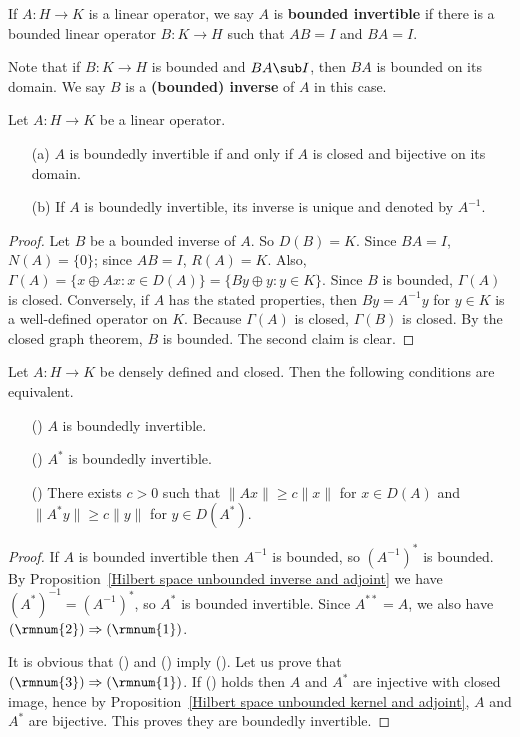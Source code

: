 \begin{definition}
If $A:H\to K$ is a linear operator, we say $A$ is \textbf{bounded invertible} if there is a bounded linear operator $B:K\to H$ such that $AB=I$ and $BA=I$.
\end{definition}
Note that if $B:K\to H$ is bounded and $BA\sub I$, then $BA$ is bounded on its domain. We say $B$ is a \textbf{(bounded) inverse} of $A$ in this case.
\begin{proposition}\label{Hilbert space unbounded bounded invertible iff}
Let $A:H\to K$ be a linear operator.
\begin{itemize}
\item[(a)] $A$ is boundedly invertible if and only if $A$ is closed and bijective on its domain.
\item[(b)] If $A$ is boundedly invertible, its inverse is unique and denoted by $A^{-1}$.
\end{itemize}
\end{proposition}
\begin{proof}
Let $B$ be a bounded inverse of $A$. So $D(B)=K$. Since $BA=I$, $N(A)=\{0\}$; since $AB=I$, $R(A)=K$. Also, $\Gamma(A)=\{x\oplus Ax:x\in D(A)\}=\{By\oplus y:y\in K\}$. Since $B$ is bounded, $\Gamma(A)$ is closed. Conversely, if $A$ has the stated properties, then $By=A^{-1}y$ for $y\in K$ is a well-defined operator on $K$. Because $\Gamma(A)$ is closed, $\Gamma(B)$ is closed. By the closed graph theorem, $B$ is bounded. The second claim is clear.
\end{proof}
\begin{proposition}\label{Hilbert space unbounded invertible iff adjoint is}
Let $A:H\to K$ be densely defined and closed. Then the following conditions are equivalent.
\begin{itemize}
\item[(\rmnum{1})] $A$ is boundedly invertible.
\item[(\rmnum{2})] $A^*$ is boundedly invertible.
\item[(\rmnum{3})] There exists $c>0$ such that $\|Ax\|\geq c\|x\|$ for $x\in D(A)$ and $\|A^*y\|\geq c\|y\|$ for $y\in D(A^*)$.
\end{itemize}
\end{proposition}
\begin{proof}
If $A$ is bounded invertible then $A^{-1}$ is bounded, so $(A^{-1})^*$ is bounded. By Proposition~\ref{Hilbert space unbounded inverse and adjoint} we have $(A^*)^{-1}=(A^{-1})^*$, so $A^*$ is bounded invertible. Since $A^{**}=A$, we also have $(\rmnum{2})\Rightarrow(\rmnum{1})$.\par
It is obvious that () and () imply (). Let us prove that $(\rmnum{3})\Rightarrow(\rmnum{1})$. If () holds then $A$ and $A^*$ are injective with closed image, hence by Proposition~\ref{Hilbert space unbounded kernel and adjoint}, $A$ and $A^*$ are bijective. This proves they are boundedly invertible.
\end{proof}
